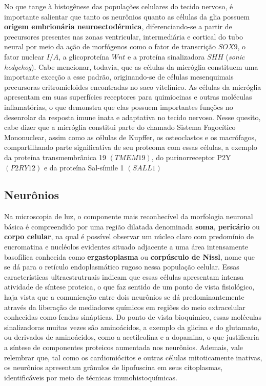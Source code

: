 \documentclass[
]{book}
\theoremstyle{definition}
\theoremstyle{definition}
\theoremstyle{definition}
\theoremstyle{definition}
\theoremstyle{remark}
\begin{document}
No que tange à histogênese das populações celulares do tecido nervoso, é importante salientar que tanto os neurônios quanto as células da glia possuem \textbf{origem embrionária neuroectodérmica}, diferenciando-se a partir de precursores presentes nas zonas ventricular, intermediária e cortical do tubo neural por meio da ação de morfógenos como o fator de transcrição \(SOX9\), o fator nuclear \(I/A\), a glicoproteína \(Wnt\) e a proteína sinalizadora \(SHH\) (\emph{sonic hedgehog}). Cabe mencionar, todavia, que as células da micróglia constituem uma importante exceção a esse padrão, originando-se de células mesenquimais precursoras eritromieloides encontradas no saco vitelínico. As células da micróglia apresentam em suas superfícies receptores para quimiocinas e outras moléculas inflamatórias, o que demonstra que elas possuem importantes funções no desenrolar da resposta imune inata e adaptativa no tecido nervoso. Nesse quesito, cabe dizer que a micróglia constitui parte do chamado Sistema Fagocítico Mononuclear, assim como as células de Kupffer, os osteoclastos e os macrófagos, compartilhando parte significativa de seu proteoma com essas células, a exemplo da proteína transmembrânica 19 \((TMEM19)\), do purinorreceptor P2Y \((P2RY12)\) e da proteína Sal-símile 1 \((SALL1)\)

\hypertarget{neuruxf4nios}{%
\subsection*{Neurônios}\label{neuruxf4nios}}

Na microscopia de luz, o componente mais reconhecível da morfologia neuronal básica é compreendido por uma região dilatada denominada \textbf{soma}, \textbf{pericário} ou \textbf{corpo celular}, na qual é possível observar um núcleo claro com predomínio de eucromatina e nucléolos evidentes situado adjacente a uma área intensamente basofílica conhecida como \textbf{ergastoplasma} ou \textbf{corpúsculo de Nissl}, nome que se dá para o retículo endoplasmático rugoso nessa população celular. Essas características ultraestrutruais indicam que essas células apresentam intensa atividade de síntese proteica, o que faz sentido de um ponto de vista fisiológico, haja vista que a comunicação entre dois neurônios se dá predominantemente através da liberação de mediadores químicos em regiões do meio extracelular conhecidas como fendas sinápticas. Do ponto de vista bioquímico, essas moléculas sinalizadoras muitas vezes são aminoácidos, a exemplo da glicina e do glutamato, ou derivados de aminoácidos, como a acetilcolina e a dopamina, o que justificaria a síntese de componentes proteicos aumentada nos neurônios. Ademais, vale relembrar que, tal como os cardiomiócitos e outras células mitoticamente inativas, os neurônios apresentam grânulos de lipofuscina em seus citoplasmas, identificáveis por meio de técnicas imunohistoquímicas.
\end{document}
